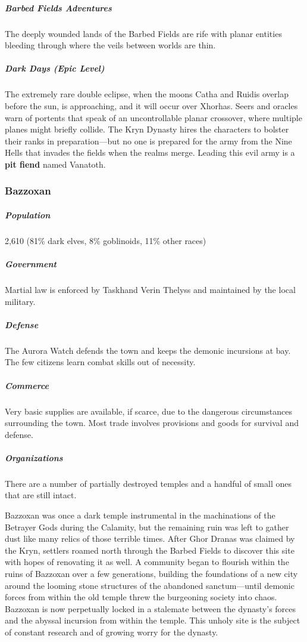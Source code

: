 \documentclass[10pt,a4paper,twoside,bg=print,twocolumn,openany,nodeprecatedcode]{dndbook}
\begin{document}
\subparagraph{Barbed Fields Adventures}
The deeply wounded lands of the Barbed Fields are rife with planar entities bleeding through where the veils between worlds are thin.

\subparagraph{Dark Days (Epic Level)}
The extremely rare double eclipse, when the moons Catha and Ruidis overlap before the sun, is approaching, and it will occur over Xhorhas. Seers and oracles warn of portents that speak of an uncontrollable planar crossover, where multiple planes might briefly collide. The Kryn Dynasty hires the characters to bolster their ranks in preparation—but no one is prepared for the army from the Nine Hells that invades the fields when the realms merge. Leading this evil army is a \textbf{pit fiend} named Vanatoth.

\subsubsection{Bazzoxan}
\subparagraph{Population}
2,610 (81\% dark elves, 8\% goblinoids, 11\% other races)

\subparagraph{Government}
Martial law is enforced by Taskhand Verin Thelyss and maintained by the local military.

\subparagraph{Defense}
The Aurora Watch defends the town and keeps the demonic incursions at bay. The few citizens learn combat skills out of necessity.

\subparagraph{Commerce}
Very basic supplies are available, if scarce, due to the dangerous circumstances surrounding the town. Most trade involves provisions and goods for survival and defense.

\subparagraph{Organizations}
There are a number of partially destroyed temples and a handful of small ones that are still intact.

Bazzoxan was once a dark temple instrumental in the machinations of the Betrayer Gods during the Calamity, but the remaining ruin was left to gather dust like many relics of those terrible times. After Ghor Dranas was claimed by the Kryn, settlers roamed north through the Barbed Fields to discover this site with hopes of renovating it as well. A community began to flourish within the ruins of Bazzoxan over a few generations, building the foundations of a new city around the looming stone structures of the abandoned sanctum—until demonic forces from within the old temple threw the burgeoning society into chaos. Bazzoxan is now perpetually locked in a stalemate between the dynasty's forces and the abyssal incursion from within the temple. This unholy site is the subject of constant research and of growing worry for the dynasty.
\end{document}
